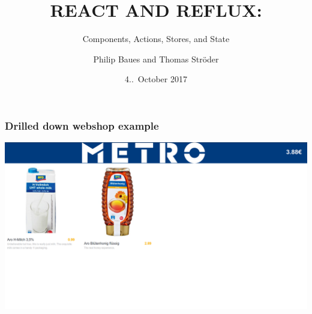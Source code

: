 \documentclass{beamer}
\begin{document}
\title[React and Reflux]{REACT AND REFLUX:}
\subtitle{Components, Actions, Stores, and State}
\author[P.\ Baues, T.\ Str\"oder]{Philip Baues and Thomas Str\"oder}
\date{4..\ October 2017}
\newcommand{\location}{\textsf{TopConf} D\"usseldorf}

\topconftitle

{
\begin{frame}[plain]
\titlepage
\end{frame}
}

\begin{frame}\frametitle{Drilled down webshop example}
\centering
\includegraphics[width=.99\linewidth,height=.85\textheight,keepaspectratio]{pics/ExampleWebshop.png}
\end{frame}
\end{document}
